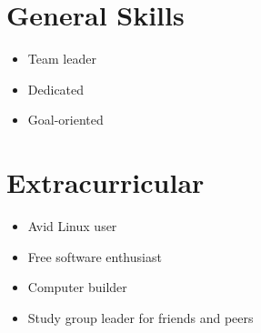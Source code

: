 \documentclass[]{article}
\theoremstyle{plain}
\theoremstyle{remark}
\theoremstyle{definition}
\begin{document}
\begin{figure}
\begin{minipage}[t]{0.32\textwidth}
\section{General Skills}
\begin{itemize}[itemsep=0em]
\item Team leader
\item Dedicated
\item Goal-oriented
\end{itemize}

\section{Extracurricular}
\begin{itemize}[itemsep=0em]
\item Avid Linux user
\item Free software enthusiast
\item Computer builder
\item Study group leader for friends and peers
\end{itemize}

\end{minipage}
\end{figure}

\printbibliography
\end{document}
